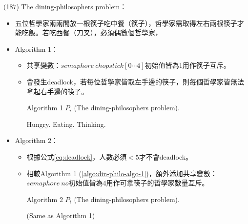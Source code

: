 \begin{theorem}{(187)} The dining-philosophers problem：\begin{itemize}
        \item 五位哲學家兩兩間放一根筷子吃中餐（筷子），哲學家需取得左右兩根筷子才能吃飯。若吃西餐（刀叉），必須偶數個哲學家，
        \item Algorithm 1：\begin{itemize}
            \item 共享變數：$semaphore \ chopstick[0 \cdots 4]$初始值皆為$1$用作筷子互斥。
            \item 會發生deadlock，若每位哲學家皆取左手邊的筷子，則每個哲學家皆無法拿起右手邊的筷子。
            \begin{algorithm}[H]
                \caption{Algorithm 1 $P_i$ (The dining-philosophers problem).}
                \label{algo:din-philo-algo-1}
                \begin{algorithmic}[1]
                        \Repeat
                            \State Hungry.
                            \State {}
                            \State {}
                            \State Eating.
                            \State {}
                            \State {}
                            \State Thinking.
                    \EndFunction
                \end{algorithmic}
            \end{algorithm}
        \end{itemize}
        \item Algorithm 2：\begin{itemize}
            \item 根據公式\ref{eq:deadlock}，人數必須$< 5$才不會deadlock。
            \item 相較Algorithm 1 (\ref{algo:din-philo-algo-1})，額外添加共享變數：$semaphore \ no$初始值皆為$4$用作可拿筷子的哲學家數量互斥。
            \begin{algorithm}[H]
                \caption{Algorithm 2 $P_i$ (The dining-philosophers problem).}
                \begin{algorithmic}[1]
                        \Repeat
                            \State {}
                            \State (Same as Algorithm 1) 
                            \State {}

\end{algorithmic}
\end{algorithm}
\end{itemize}
\end{itemize}
\end{theorem}
